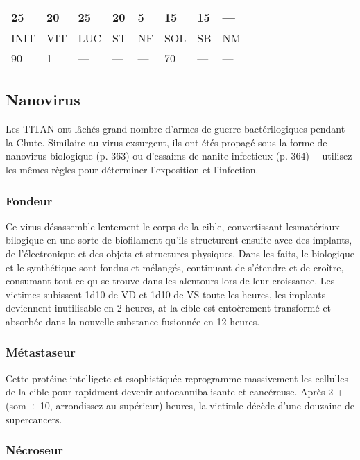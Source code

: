 {\begin{tabular}{|l|l|l|l|l|l|l|l|}
25 &20 &25 &20 &5 &15 &15 &— \\ \hline

INIT &VIT &LUC &ST &NF &SOL &SB &NM \\ \hline

90 &1 &— &— &— &70 &— &— \\ \hline

\end{tabular} 





\subsection{Nanovirus} 

Les TITAN ont lâchés grand nombre d'armes de guerre bactérilogiques pendant la Chute. Similaire au virus exsurgent, ils ont étés propagé sous la forme de nanovirus biologique (p. 363) ou d'essaims de nanite infectieux (p. 364)— utilisez les mêmes règles pour déterminer l'exposition et l'infection. 

\subsubsection{Fondeur} 

Ce virus désassemble lentement le corps de la cible, convertissant lesmatériaux bilogique en une sorte de biofilament qu'ils structurent ensuite avec des implants, de l'électronique et des objets et structures physiques. Dans les faits, le biologique et le synthétique sont fondus et mélangés, continuant de s'étendre et de croître, consumant tout ce qu se trouve dans les alentours lors de leur croissance. Les victimes subissent 1d10 de VD et 1d10 de VS toute les heures, les implants deviennent inutilisable en 2 heures, at la cible est entoèrement transformé et absorbée dans la nouvelle substance fusionnée en 12 heures. 

\subsubsection{Métastaseur} 

Cette protéine intelligete et esophistiquée reprogramme massivement les cellulles de la cible pour rapidment devenir autocannibalisante et cancéreuse. Après 2 + (som $\div$ 10, arrondissez au supérieur) heures, la victimle décède d'une douzaine de supercancers. 

\subsubsection{Nécroseur} 

}
